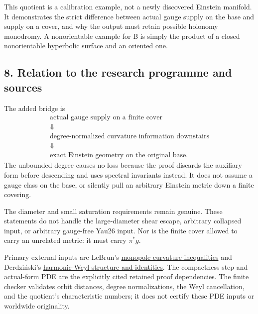 \documentclass[
  11pt,
]{article}
\begin{document}
This quotient is a calibration example, not a newly discovered Einstein
manifold. It demonstrates the strict difference between actual gauge
supply on the base and supply on a cover, and why the output must retain
possible holonomy monodromy. A nonorientable example for B is simply the
product of a closed nonorientable hyperbolic surface and an oriented
one.

\hypertarget{relation-to-the-research-programme-and-sources}{%
\subsection{8. Relation to the research programme and
sources}\label{relation-to-the-research-programme-and-sources}}

The added bridge is \[
 \begin{gathered}
 \text{actual gauge supply on a finite cover}\\
 \Downarrow\\
 \text{degree-normalized curvature information downstairs}\\
 \Downarrow\\
 \text{exact Einstein geometry on the original base}.
 \end{gathered}
\] The unbounded degree causes no loss because the proof discards the
auxiliary form before descending and uses spectral invariants instead.
It does not assume a gauge class on the base, or silently pull an
arbitrary Einstein metric down a finite covering.

The diameter and small saturation requirements remain genuine. These
statements do not handle the large-diameter shear escape, arbitrary
collapsed input, or arbitrary gauge-free Yau26 input. Nor is the finite
cover allowed to carry an unrelated metric: it must carry \(\pi^*g\).

Primary external inputs are LeBrun's
\href{https://arxiv.org/html/math/0003068}{monopole curvature
inequalities} and Derdziński's
\href{https://www.numdam.org/article/CM_1983__49_3_405_0.pdf}{harmonic-Weyl
structure and identities}. The compactness step and actual-form PDE are
the explicitly cited retained proof dependencies. The finite checker
validates orbit distances, degree normalizations, the Weyl cancellation,
and the quotient's characteristic numbers; it does not certify these PDE
inputs or worldwide originality.
\end{document}

